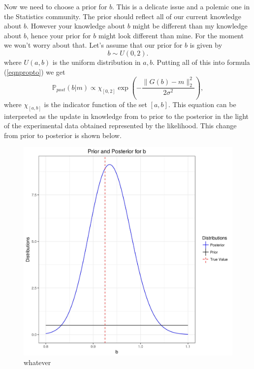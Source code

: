 \documentclass[12pt]{book}
\newcommand{\post}{\mathbb{P}_{post}}
\begin{document}
Now we need to choose a prior for $b$. This is a delicate issue and a polemic one in the Statistics community.
The prior should reflect all of our current knowledge about $b$. However your knowledge about $b$ might be 
different than my knowledge about $b$, hence your prior for $b$ might look different than mine. For
the moment  we won't worry about that. Let's assume that our prior for $b$ is given by
\begin{equation*}
b\sim U(0,2).
\end{equation*}
where $U(a,b)$ is the uniform distribution in $a,b$. Putting all of this into formula (\ref{eqnpropto}) we get
\begin{equation*}
\post(b|m)\propto\chi_{[0,2]}\exp\left(-\frac{\|G(b)-m\|_{2}^{2}}{2\sigma^{2}}\right),
\end{equation*}
where $\chi_{[a,b]}$ is the indicator function of the set $[a,b]$. This equation can be 
interpreted as the update in knowledge from to prior to the posterior in the light of the
experimental data obtained represented by the likelihood. This change from prior to 
posterior is shown below.
\begin{figure}[H]
\centering
\includegraphics[scale=0.8]{./FigChap3/prior_posterior.jpg}
\caption{whatever}
\end{figure} 
\end{document}

